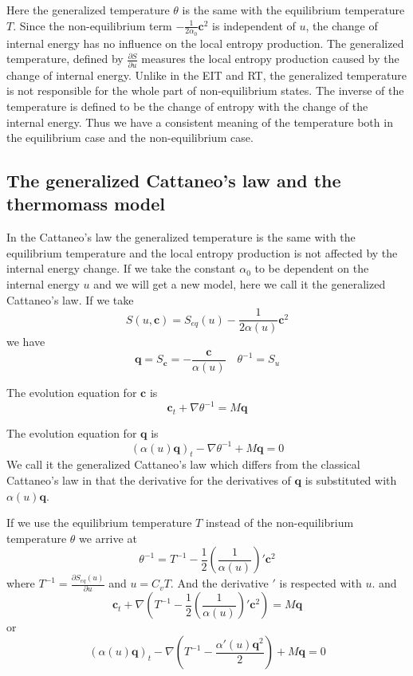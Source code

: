 \documentclass[a4paper]{article}
\begin{document}
Here the generalized temperature $\theta$ is the same with the equilibrium temperature $T$. Since the non-equilibrium term $-\frac{1}{2\alpha_0}\mathbf{c}^2$ is independent of $u$, the change of internal energy has no influence on the local entropy production. The generalized temperature, defined by $\frac{\partial S}{\partial u}$ measures the local entropy production caused by the change of internal energy. Unlike in the EIT and RT, the generalized temperature is not responsible for the whole part of non-equilibrium states. The inverse of the temperature is defined to be the change of entropy with the change of the internal energy. Thus we have a consistent meaning of the temperature both in the equilibrium case and the non-equilibrium case.

\subsection{The generalized Cattaneo's law and the thermomass model}
In the Cattaneo's law the generalized temperature is the same with the equilibrium temperature and the local entropy production is not affected by the internal energy change. If we take the constant $\alpha_0$ to be dependent on the internal energy $u$ and we will get a new model, here we call it the generalized Cattaneo's law.
If we take
\begin{equation}
S(u,\mathbf{c})=S_{eq}(u)-\frac{1}{2\alpha(u)} \mathbf{c}^2
\end{equation}
we have 
\begin{equation}
\mathbf{q} = S_{\mathbf{c}}=-\frac{ \mathbf{c}}{\alpha(u)} \quad \theta^{-1}=S_u
\end{equation}

The evolution equation for $\mathbf{c}$ is 
\begin{equation}
\mathbf{c}_t+\nabla \theta^{-1}=M \mathbf{q}
\end{equation}

The evolution equation for $\mathbf{q}$ is
\begin{equation}\label{eq_theta}
({\alpha(u)}\mathbf{q})_t-\nabla \theta^{-1}+M\mathbf{q}=0
\end{equation}
We call it the generalized Cattaneo's law which differs from the classical Cattaneo's law in that the derivative for the derivatives of $\mathbf{q}$ is substituted with ${\alpha(u)}\mathbf{q}$.

If we use the equilibrium temperature $T$ instead of the non-equilibrium temperature $\theta$ we arrive at
\begin{equation}
\theta^{-1}=T^{-1}-\frac{1}{2}(\frac{1}{\alpha(u)})'\mathbf{c}^2
\end{equation}
where $T^{-1}=\frac{\partial S_{eq}(u)}{\partial u}$ and $u=C_v T$. And the derivative $'$ is respected with $u$.
and
\begin{equation}
\mathbf{c}_t+\nabla(T^{-1}-\frac{1}{2}(\frac{1}{\alpha(u)})' \mathbf{c}^2)=M\mathbf{q}
\end{equation}
or
\begin{equation}\label{eq_Teq}
({\alpha(u)}{\mathbf{q}})_t-\nabla(T^{-1}- \frac{\alpha'(u)\mathbf{q}^2}{2})+M\mathbf{q}=0
\end{equation}
\end{document}
